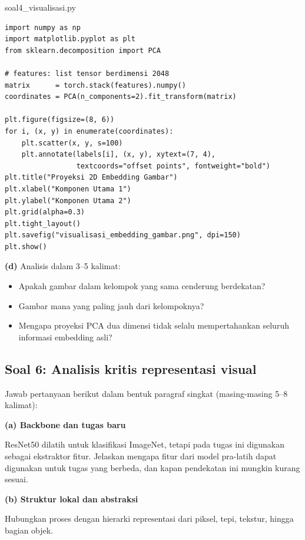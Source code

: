 \documentclass[12pt, a4paper]{article}
\begin{document}
\begin{codewindow}{soal4\_visualisasi.py}
\begin{lstlisting}[style=pycode]
import numpy as np
import matplotlib.pyplot as plt
from sklearn.decomposition import PCA

# features: list tensor berdimensi 2048
matrix      = torch.stack(features).numpy()
coordinates = PCA(n_components=2).fit_transform(matrix)

plt.figure(figsize=(8, 6))
for i, (x, y) in enumerate(coordinates):
    plt.scatter(x, y, s=100)
    plt.annotate(labels[i], (x, y), xytext=(7, 4),
                 textcoords="offset points", fontweight="bold")
plt.title("Proyeksi 2D Embedding Gambar")
plt.xlabel("Komponen Utama 1")
plt.ylabel("Komponen Utama 2")
plt.grid(alpha=0.3)
plt.tight_layout()
plt.savefig("visualisasi_embedding_gambar.png", dpi=150)
plt.show()
\end{lstlisting}
\end{codewindow}

\textbf{(d)} Analisis dalam 3--5 kalimat:
\begin{itemize}
  \item Apakah gambar dalam kelompok yang sama cenderung berdekatan?
  \item Gambar mana yang paling jauh dari kelompoknya?
  \item Mengapa proyeksi PCA dua dimensi tidak selalu mempertahankan seluruh informasi embedding asli?
\end{itemize}

\subsection{Soal 6: Analisis kritis representasi visual}
\label{sec:soal5-analisis}

Jawab pertanyaan berikut dalam bentuk paragraf singkat (masing-masing 5--8 kalimat):

\textbf{(a) Backbone dan tugas baru}

ResNet50 dilatih untuk klasifikasi ImageNet, tetapi pada tugas ini digunakan sebagai ekstraktor fitur. Jelaskan mengapa fitur dari model pra-latih dapat digunakan untuk tugas yang berbeda, dan kapan pendekatan ini mungkin kurang sesuai.

\textbf{(b) Struktur lokal dan abstraksi}

Hubungkan proses  dengan hierarki representasi dari piksel, tepi, tekstur, hingga bagian objek.
\end{document}

